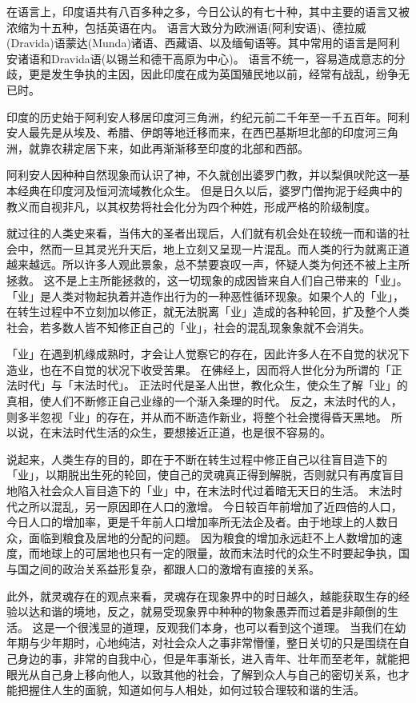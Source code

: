 \documentclass[twoside,openany]{book}
\begin{document}
在语言上，印度语共有八百多种之多，今日公认的有七十种，其中主要的语言又被浓缩为十五种，包括英语在内。
语言大致分为欧洲语(阿利安语)、德拉威(Dravida)语蒙达(Munda)诸语、西藏语、以及缅甸语等。其中常用的语言是阿利安诸语和Dravida语(以锡兰和德干高原为中心)。
语言不统一，容易造成意志的分歧，更是发生争执的主因，因此印度在成为英国殖民地以前，经常有战乱，纷争无已时。

印度的历史始于阿利安人移居印度河三角洲，约纪元前二千年至一千五百年。阿利安人最先是从埃及、希腊、伊朗等地迁移而来，在西巴基斯坦北部的印度河三角洲，就靠农耕定居下来，如此再渐渐移至印度的北部和西部。

阿利安人因种种自然现象而认识了神，不久就创出婆罗门教，并以梨俱吠陀这一基本经典在印度河及恒河流域教化众生。
但是日久以后，婆罗门僧拘泥于经典中的教义而自视非凡，以其权势将社会化分为四个种姓，形成严格的阶级制度。

就过往的人类史来看，当伟大的圣者出现后，人们就有机会处在较统一而和谐的社会中，然而一旦其灵光升天后，地上立刻又呈现一片混乱。而人类的行为就离正道越来越远。所以许多人观此景象，总不禁要哀叹一声，怀疑人类为何还不被上主所拯救。
这不是上主所能拯救的，这一切现象的成因皆来自人们自己带来的「业」。「业」是人类对物起执着并造作出行为的一种恶性循环现象。如果个人的「业」，在转生过程中不立刻加以修正，就无法脱离「业」造成的各种轮回，扩及整个人类社会，若多数人皆不知修正自己的「业」，社会的混乱现象象就不会消失。

「业」在遇到机缘成熟时，才会让人觉察它的存在，因此许多人在不自觉的状况下造业，也在不自觉的状况下收受苦果。
在佛经上，因而将人世化分为所谓的「正法时代」与「末法时代」。
正法时代是圣人出世，教化众生，使众生了解「业」的真相，使人们不断修正自己业缘的一个渐入条理的时代。
反之，末法时代的人，则多半忽视「业」的存在，并从而不断造作新业，将整个社会搅得昏天黑地。
所以说，在末法时代生活的众生，要想接近正道，也是很不容易的。

说起来，人类生存的目的，即在于不断在转生过程中修正自己以往盲目造下的「业」，以期脱出生死的轮回，使自己的灵魂真正得到解脱，否则就只有再度盲目地陷入社会众人盲目造下的「业」中，在末法时代过着暗无天日的生活。
末法时代之所以混乱，另一原因即在人口的激增。
今日较百年前增加了近四倍的人口，今日人口的增加率，更是千年前人口增加率所无法企及者。由于地球上的人数日众，面临到粮食及居地的分配的问题。
因为粮食的增加永远赶不上人数增加的速度，而地球上的可居地也只有一定的限量，故而末法时代的众生不时要起争执，国与国之间的政治关系益形复杂，都跟人口的激增有直接的关系。

此外，就灵魂存在的观点来看，灵魂存在现象界中的时日越久，越能获取生存的经验以达和谐的境地，反之，就易受现象界中种种的物象愚弄而过着是非颠倒的生活。
这是一个很浅显的道理，反观我们本身，也可以看到这个道理。
当我们在幼年期与少年期时，心地纯洁，对社会众人之事非常懵懂，整日关切的只是围绕在自己身边的事，非常的自我中心，但是年事渐长，进入青年、壮年而至老年，就能把眼光从自己身上移向他人，以致其他的社会，了解到众人与自己的密切关系，也才能把握住人生的面貌，知道如何与人相处，如何过较合理较和谐的生活。
\end{document}
